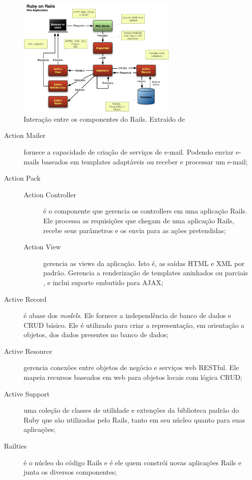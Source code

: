 \graphicspath{{figuras/}}
\begin{figure}[H]
\centering
\includegraphics[width=0.7\textwidth]{rails-overview}
\caption{Interação entre os componentes do Rails. Extraído  de \cite{mejia2011rails}}
\label{fig:rails-architecture}
\end{figure}


\begin{description}

\item [Action Mailer] fornece a capacidade de criação de serviços de e-mail. Podendo enviar e-
mails baseados em templates adaptáveis ou receber e processar um e-mail;

\item [Action Pack]

 \begin{description}

	 \item [Action Controller] é o componente que gerencia os controllers em uma aplicação
	Rails. Ele processa as requisições que chegam de uma aplicação Rails, recebe seus
	parâmetros e os envia para as ações pretendidas; 

	 \item [Action View] gerencia as views da aplicação. Isto é, as saídas HTML e XML por
	padrão. Gerencia a renderização de templates aninhados ou parciais , e inclui suporte
	embutido para AJAX;

 \end{description}

\item [Active Record] é abase dos \textit{models}. Ele fornece a independência de banco de dados e CRUD básico. Ele é utilizado para criar a representação, em orientação a objetos, dos
dados presentes no banco de dados;

\item [Active Resource] gerencia conexões entre objetos de negócio e serviços web RESTful.
Ele mapeia recursos baseados em web para objetos locais com lógica CRUD;

\item [Active Support] uma coleção de classes de utilidade e extenções da biblioteca padrão do
Ruby que são utilizadas pelo Rails, tanto em seu núcleo quanto para suas aplicações;

\item [Railties] é o núcleo do código Rails e é ele quem constrói novas aplicações Rails e junta os diversos componentes;

\end{description}
















